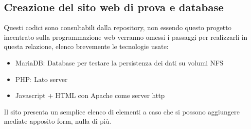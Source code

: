 \documentclass[a4paper]{article}
\begin{document}
\subsection{Creazione del sito web di prova e database}
Questi codici sono consultabili dalla repository, non essendo questo progetto incentrato sulla programmazione
web verranno omessi i passaggi per realizzarli in questa relazione, elenco brevemente le tecnologie usate:
\begin{itemize}
    \item MariaDB: Database per testare la persistenza dei dati su volumi NFS
    \item PHP: Lato server
    \item Javascript + HTML con Apache come server http
\end{itemize}
Il sito presenta un semplice elenco di elementi a caso che si possono aggiungere mediate apposito form, nulla di più.

\printglossaries
\printbibliography
\end{document}

